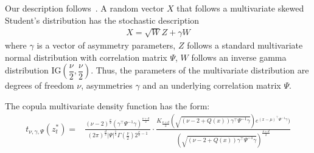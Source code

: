 Our description follows~\textcite{ChristoffersenLanglois2013}. A random vector $X$ that follows a multivariate skewed Student's distribution has the stochastic description
\begin{align}
  X = \sqrt{W}Z + \gamma W
\end{align}
where $\gamma$ is a vector of asymmetry parameters, $Z$ follows a standard multivariate normal distribution with correlation matrix $\Psi$, $W$ follows an inverse gamma distribution $\text{IG}(\dfrac{\nu}{2}, \dfrac{\nu}{2})$. Thus, the parameters of the multivariate distribution are degrees of freedom $\nu$, asymmetries $\gamma$ and an underlying correlation matrix $\Psi$.

The copula multivariate density function has the form:
\begin{align*}
  t_{\nu,\gamma,\Psi}(z_t^*) =
    & \frac{(\nu - 2)^\frac{\nu}{2} (\gamma^\top \Psi^{-1} \gamma)^{\frac{\nu+d}{2}}}{(2 \pi)^{\frac{d}{2}} |\Psi|^\frac{1}{2} \Gamma (\frac{\nu}{2}) 2^{\frac{\nu}{2} - 1}} \cdot \frac{K_{\frac{\nu + d}{2}} ( \sqrt{(\nu - 2 + Q(x)) \gamma^\top \Psi^{-1} \gamma}) e^{(x-\mu)^\top \Psi^{-1} \gamma} )}{( \sqrt{(\nu - 2 + Q(x)) \gamma^\top \Psi^{-1} \gamma})^{\frac{\nu + d}{2}}} 
\end{align*}

